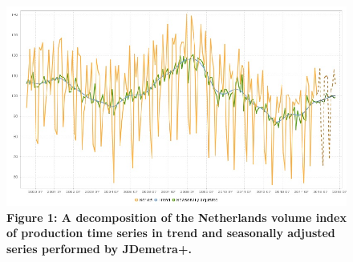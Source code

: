 \documentclass{article}
\begin{document}
\begin{figure}[H]
  \includegraphics[width=\linewidth]{../images/capitolo1/intro.jpg}
  {\textbf{\scriptsize Figure 1: A decomposition of the Netherlands volume index of production time series in trend and seasonally adjusted series performed by JDemetra+.}}
\end{figure}
\end{document}
